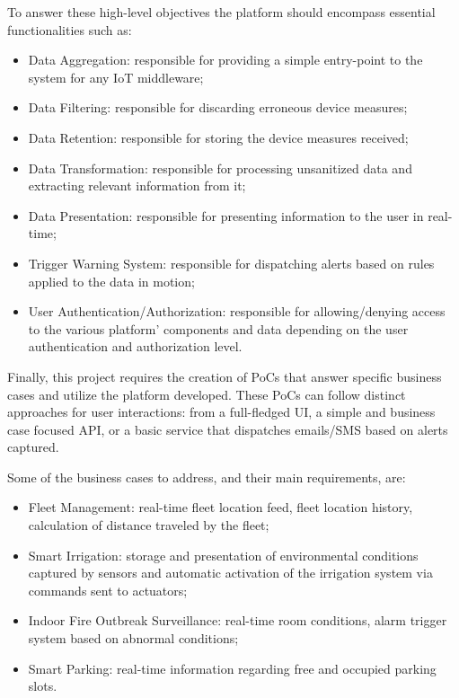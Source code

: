 To answer these high-level objectives the platform should encompass essential functionalities such as:

\begin{itemize}
    \item Data Aggregation: responsible for providing a simple entry-point to the system for any \gls{IoT} middleware;
    \item Data Filtering: responsible for discarding erroneous device measures;
    \item Data Retention: responsible for storing the device measures received;
    \item Data Transformation: responsible for processing unsanitized data and extracting relevant information from it;
    \item Data Presentation: responsible for presenting information to the user in real-time;
    \item Trigger Warning System: responsible for dispatching alerts based on rules applied to the data in motion;
    \item User Authentication/Authorization: responsible for allowing/denying access to the various platform' components and data depending on the user authentication and authorization level.
\end{itemize}

Finally, this project requires the creation of \gls{PoC}s that answer specific business cases and utilize the platform developed. These \gls{PoC}s can follow distinct approaches for user interactions: from a full-fledged \gls{UI}, a simple and business case focused \gls{API}, or a basic service that dispatches emails/SMS based on alerts captured.

Some of the business cases to address, and their main requirements, are:

\begin{itemize}
    \item Fleet Management: real-time fleet location feed, fleet location history, calculation of distance traveled by the fleet;
    \item Smart Irrigation: storage and presentation of environmental conditions captured by sensors and automatic activation of the irrigation system via commands sent to actuators;
    \item Indoor Fire Outbreak Surveillance: real-time room conditions, alarm trigger system based on abnormal conditions;
    \item Smart Parking: real-time information regarding free and occupied parking slots.
\end{itemize}

